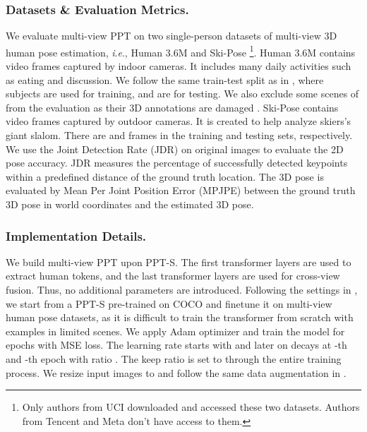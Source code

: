\documentclass[runningheads]{llncs}
\newcommand{\ie}{\textit{i}.\textit{e}., }
\begin{document}
\subsubsection{Datasets \& Evaluation Metrics.} 
We evaluate multi-view PPT on two single-person datasets of multi-view 3D human pose estimation, \ie Human 3.6M \cite{h36m_pami,IonescuSminchisescu11} and Ski-Pose \cite{sporri2016reasearch,fasel2017joint} \footnote{Only authors from UCI downloaded and accessed these two datasets. Authors from Tencent and Meta don't have access to them. }. 
Human 3.6M contains video frames captured by  indoor cameras. 
It includes many daily activities such as eating and discussion. We follow the same train-test split as in \cite{qiu2019cross,iskakov2019learnable,he2020epipolar}, where subjects  are used for training, and  are for testing. 
We also exclude some scenes of   from the evaluation as their 3D annotations are damaged \cite{iskakov2019learnable}. 
Ski-Pose contains video frames captured by outdoor cameras. It is created to help analyze skiers's giant slalom. There are  and  frames in the training and testing sets, respectively. 
We use the Joint Detection Rate (JDR) on original images \cite{qiu2019cross} to evaluate the 2D pose accuracy. 
JDR measures the percentage of successfully detected keypoints within a predefined distance of the ground truth location. 
The 3D pose is evaluated by Mean Per Joint Position Error (MPJPE) between the ground truth 3D pose in world coordinates and the estimated 3D pose. 





\subsubsection{Implementation Details. } 
We build multi-view PPT upon PPT-S. The first  transformer layers are used to extract human tokens, and the last  transformer layers are used for cross-view fusion. Thus, no additional parameters are introduced. 
Following the settings in \cite{he2020epipolar,ma2021transfusion}, we start from a PPT-S pre-trained on COCO and finetune it on multi-view human pose datasets, as it is difficult to train the transformer from scratch with examples in limited scenes. 
We apply Adam optimizer and train the model for  epochs with MSE loss. The learning rate starts with  and later on decays at -th and -th epoch with ratio . The keep ratio  is set to  through the entire training process. 
We resize input images to  and follow the same data augmentation in \cite{qiu2019cross,ma2021transfusion}. 
\end{document}
